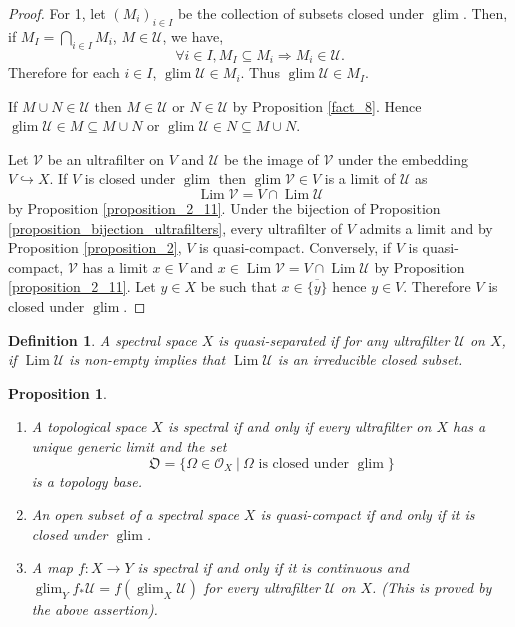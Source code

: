 \documentclass[8pt]{article}
\numberwithin{equation}{section}
\newtheorem{proposition}{Proposition}[subsection]
\newtheorem{definition}{Definition}[subsection]
\DeclareMathOperator{\Lim}{Lim}
\DeclareMathOperator{\glim}{glim}
\newcommand{\Ouv}{\mathscr{O}}
\newcommand{\U}[0]{\mathcal{U}}
\newcommand{\sep}[0]{\:|\:}
\begin{document}
\begin{proof}
    For 1, let $(M_i)_{i\in I}$ be the collection of subsets closed under $\glim$. Then, if $M_I = \bigcap_{i\in I}M_i$, $M\in\U$, we have,
    \begin{equation*}
    \forall i\in I, M_I\subseteq M_i \Rightarrow M_i\in\U.
    \end{equation*}
    Therefore for each $i\in I$, $\glim\U\in M_i$. Thus $\glim\U\in M_I$.
    \par If $M\cup N\in\U$ then $M\in\U$ or $N\in\U$ by Proposition \ref{fact_8}. Hence $\glim\U\in M\subseteq M\cup N$ or $\glim\U\in N\subseteq M\cup N$.
    \par Let $\mathcal{V}$ be an ultrafilter on $V$ and $\mathcal{U}$ be the image of $\mathcal{V}$ under the embedding $V\hookrightarrow X$. If $V$ is closed under $\glim$ then $\glim\mathcal{V}\in V$ is a limit of $\U$ as 
    \begin{equation*}
    \Lim\mathcal{V} = V\cap\Lim\U
    \end{equation*}
    by Proposition \ref{proposition_2_11}.
    Under the bijection of Proposition \ref{proposition_bijection_ultrafilters}, every ultrafilter of $V$ admits a limit and by Proposition \ref{proposition_2}, $V$ is quasi-compact. Conversely, if $V$ is quasi-compact, $\mathcal{V}$ has a limit $x\in V$ and $x\in\Lim\mathcal{V} = V\cap\Lim\mathcal{U}$ by Proposition \ref{proposition_2_11}. Let $y\in X$ be such that $x\in\overline{\{y\}}$ hence $y\in V$. Therefore $V$ is closed under $\glim$.
\end{proof}

\begin{definition}
    A spectral space $X$ is quasi-separated if for any ultrafilter $\U$ on $X$, if $\Lim\U$ is non-empty implies that $\Lim\U$ is an irreducible closed subset.
\end{definition}

\begin{proposition}$\:$
    \label{proposition_4}
    \begin{enumerate}[1.]
        \item A topological space $X$ is spectral if and only if every ultrafilter on $X$ has a unique generic limit and the set 
        \begin{equation*}
            \mathfrak{O}=\{\Omega\in\Ouv_X\sep \text{$\Omega$ is closed under $\glim$}\}
        \end{equation*}
        is a topology base.
        \item An open subset of a spectral space $X$ is quasi-compact if and only if it is closed under $\glim$.
        \item A map $f:X\to Y$ is spectral if and only if it is continuous and $\glim_Y f_*\U = f(\glim_X\U)$ for every ultrafilter $\U$ on $X$. (This is proved by the above assertion).
    \end{enumerate}
\end{proposition}
\end{document}
